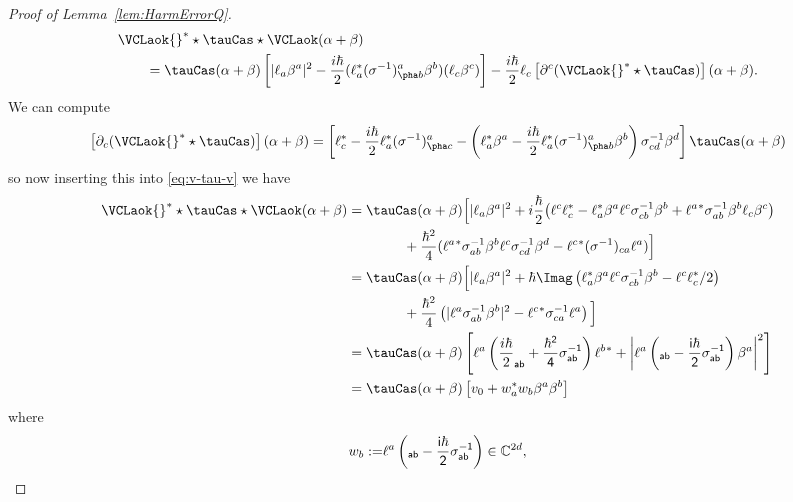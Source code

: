 \documentclass{article}
\numberwithin{equation}{section}
\begin{document}
\begin{proof}[Proof of Lemma~\ref{lem:HarmErrorQ}]
\begin{align}
\begin{split}
			&\VCLaok{}^* \star \tauCas \star \VCLaok (\alpha+\beta)
			\\
			&\qquad =
			\tauCas(\alpha+\beta)\left[
			|\ell_a\beta^a|^2
			- \frac{i\hbar}{2}(\ell_a^*(\sigma^{-1})^a_{\pha b} \beta^b)( \ell_c\beta^c) \right]
			-
			\frac{i\hbar}{2} \ell_c \left[ \partial^c ( \VCLaok{}^* \star \tauCas)\right](\alpha+\beta) .
	\end{split}\end{align}
	We can compute
	\begin{align}
		\left[ \partial_c ( \VCLaok{}^*\star \tauCas)\right](\alpha+\beta)
		= \left[\ell_c^* - \frac{i\hbar}{2} \ell_a^* (\sigma^{-1})^a_{\pha c} -
		\left(\ell_a^*\beta^a - \frac{i\hbar}{2}\ell_a^* (\sigma^{-1})^a_{\pha b}\beta^b\right)
		\sigma^{-1}_{cd}\beta^d
		\right]\tauCas(\alpha + \beta)
	\end{align}
	so now inserting this into \eqref{eq:v-tau-v} we have 
	\begin{equation}\label{eq:linear-outside-integral-part-2}
		\begin{split}
			\VCLaok{}^* \star \tauCas \star \VCLaok (\alpha+\beta)
			&= \tauCas(\alpha+\beta)
			\Big[
			|\ell_a\beta^a|^2 +
			i\frac{\hbar}{2}
			\big(\ell^c \ell^*_c - \ell^*_a\beta^a \ell^c\sigma^{-1}_{cb}\beta^b
			+  \ell^a{}^* \sigma^{-1}_{a b} \beta^b \ell_c\beta^c \big) \\
			&\qquad \qquad
			+ \frac{\hbar^2}{4} ( \ell^a{}^* \sigma^{-1}_{a b}\beta^b \ell^c\sigma^{-1}_{cd}\beta^d
			-  \ell^c{}^* (\sigma^{-1})_{ca} \ell^a)\Big]\\
			&= \tauCas(\alpha+\beta)
			\Big[
			|\ell_a\beta^a|^2 +
			\hbar
			\Imag \left(\ell^*_a\beta^a \ell^c\sigma^{-1}_{cb}\beta^b -\ell^c \ell^*_c/2 \right) \\
			&\qquad \qquad
			+ \frac{\hbar^2}{4} \left( |\ell^a \sigma^{-1}_{a b}\beta^b|^2
			-  \ell^c{}^* \sigma^{-1}_{ca} \ell^a\right)\Big]\\
			&= \tauCas(\alpha+\beta)
			\left[
			{\ell^a} \left(\frac{i\hbar}{2} \sf_{ab} + \frac{\hbar^2}{4} \sigma^{-1}_{ab}\right) \ell^b{}^* + \left|\ell^a \left(\sf_{ab}-\frac{i\hbar}{2}\sigma^{-1}_{ab}\right)\beta^a\right|^2 \right]\\
			&= \tauCas(\alpha+\beta)
			\left[
			v_0 
			+ w_a^* w_b \beta^a \beta^b \right]
		\end{split}
	\end{equation}
	where
	\begin{align}
		w_b :=& \ell^a \left(\sf_{ab}-\frac{i\hbar}{2}\sigma^{-1}_{ab}\right) \in \mathbb{C}^{2d},\\

\end{align}
\end{proof}
\end{document}
